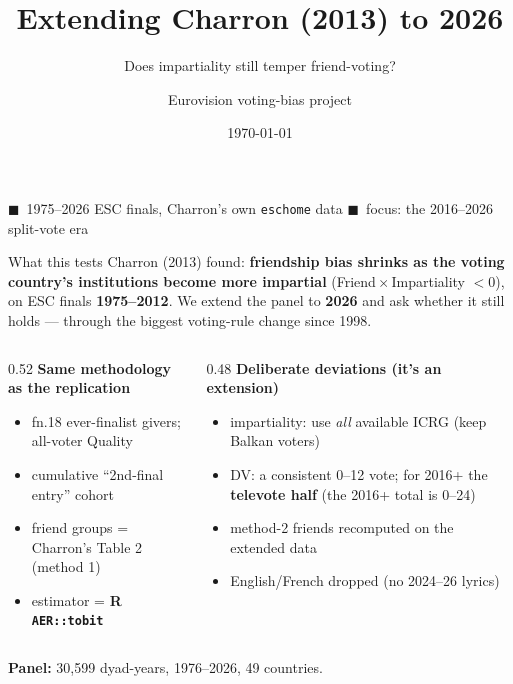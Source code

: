 \documentclass[aspectratio=169,10pt]{beamer}
\title[Charron to 2026]{Extending Charron (2013) to 2026}
\subtitle{Does impartiality still temper friend-voting?}
\author{Eurovision voting-bias project}
\date{\today}
\newcommand{\rep}[1]{{\color{repcol}#1}}
\newcommand{\spl}[1]{{\color{splitcol}#1}}
\begin{document}
{
\begin{frame}[plain]
  \titlepage
  \begin{center}\small
  \rep{$\blacksquare$~1975--2026 ESC finals, Charron's own \texttt{eschome} data}\qquad
  \spl{$\blacksquare$~focus: the 2016--2026 split-vote era}
  \end{center}
\end{frame}}

\begin{frame}{What this tests}
  Charron (2013) found: \textbf{friendship bias shrinks as the voting country's
  institutions become more impartial} (Friend\,$\times$\,Impartiality $<0$), on
  ESC finals \textbf{1975--2012}.  We extend the panel to \textbf{2026} and ask
  whether it still holds --- through the biggest voting-rule change since 1998.
  \vspace{4pt}
  \begin{columns}[T]
    \begin{column}{0.52\textwidth}
      \textbf{Same methodology as the replication}
      \begin{itemize}\small
        \item fn.18 ever-finalist givers; all-voter Quality
        \item cumulative ``2nd-final entry'' cohort
        \item friend groups = Charron's Table 2 (method 1)
        \item estimator = \textbf{R \texttt{AER::tobit}}
      \end{itemize}
    \end{column}
    \begin{column}{0.48\textwidth}
      \textbf{Deliberate deviations (it's an extension)}
      \begin{itemize}\small
        \item impartiality: use \emph{all} available ICRG (keep Balkan voters)
        \item DV: a consistent 0--12 vote; for 2016+ the \textbf{televote half}
          (the 2016+ total is 0--24)
        \item method-2 friends recomputed on the extended data
        \item English/French dropped (no 2024--26 lyrics)
      \end{itemize}
    \end{column}
  \end{columns}
  \vspace{4pt}
  \footnotesize \rep{\textbf{Panel:}} 30{,}599 dyad-years, 1976--2026, 49 countries.
\end{frame}
\end{document}
